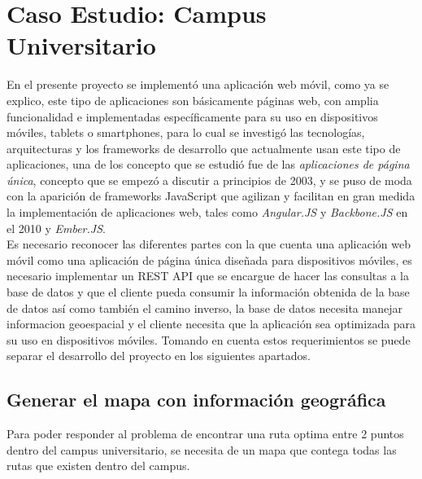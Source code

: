  \chapter{Caso Estudio: Campus Universitario}
\label{chap:Caso Estudio: Campus Universitario}


En el presente proyecto se implementó una aplicación web móvil, como ya se explico, este tipo de aplicaciones son básicamente páginas web, con amplia funcionalidad e implementadas específicamente para su uso en dispositivos móviles, tablets o smartphones, para lo cual se investigó las tecnologías, arquitecturas y los frameworks de desarrollo que actualmente usan este tipo de aplicaciones, una de los concepto que se estudió fue de las \emph{aplicaciones de página única}, concepto que se empezó a discutir a principios de 2003, y se puso de moda con la aparición de frameworks JavaScript que agilizan y facilitan en gran medida la implementación de aplicaciones web, tales como  \emph{Angular.JS} y \emph{Backbone.JS} en el 2010 y \emph{Ember.JS}. \\

Es necesario reconocer las diferentes partes con la que cuenta una aplicación web móvil como una aplicación de página única diseñada para dispositivos móviles, es necesario implementar un REST API que se encargue de hacer las consultas a la base de datos y que el cliente pueda consumir la información obtenida de la base de datos así como también el camino inverso, la base de datos necesita manejar informacion geoespacial y el cliente necesita que la aplicación sea optimizada para su uso en dispositivos móviles. Tomando en cuenta estos requerimientos se puede separar el desarrollo del proyecto en los siguientes apartados. \\



\section{Generar el mapa con información geográfica}
\label{sec:generar_mapa_rutas}

Para poder responder al problema de encontrar una ruta optima entre 2 puntos dentro del campus universitario, se necesita de un mapa que contega todas las rutas que existen dentro del campus.\\


